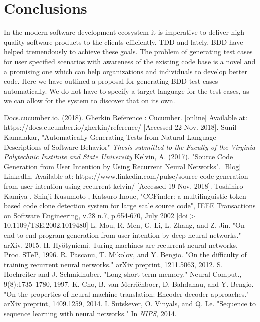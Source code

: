 \documentclass[conference, onecolumn, a4, 12pt]{IEEEtran}
\begin{document}
\section{Conclusions}
In the modern software development ecosystem it is imperative to deliver high quality software products to the clients efficiently. TDD and lately, BDD have helped tremendously to achieve these goals. The problem of generating test cases for user specified scenarios with awareness of the existing code base is a novel and a promising one which can help organizations and individuals to develop better code. Here we have outlined a proposal for generating BDD test cases automatically. We do not have to specify a target language for the test cases, as we can allow for the system to discover that on its own.

\begin{thebibliography}{00}
 Docs.cucumber.io. (2018). Gherkin Reference : Cucumber. [online] Available at: https://docs.cucumber.io/gherkin/reference/ [Accessed 22 Nov. 2018].
 Sunil Kamalakar, "Automatically Generating Tests from Natural Language Descriptions of Software Behavior" \textit{Thesis submitted to the Faculty of the
	Virginia Polytechnic Institute and State University
}
Kelvin, A. (2017). "Source Code Generation from User Intention by Using Recurrent Neural Networks". [Blog] LinkedIn. Available at: https://www.linkedin.com/pulse/source-code-generation-from-user-intention-using-recurrent-kelvin/ [Accessed 19 Nov. 2018].
 Toshihiro Kamiya , Shinji Kusumoto , Katsuro Inoue, "CCFinder: a multilinguistic token-based code clone detection system for large scale source code", IEEE Transactions on Software Engineering, v.28 n.7, p.654-670, July 2002  [doi$>$10.1109/TSE.2002.1019480]
 L. Mou, R. Men, G. Li, L. Zhang, and Z. Jin. "On end-to-end program generation from user intention by deep neural networks." arXiv, 2015.
 H. Hy\"{o}tyniemi. Turing machines are recurrent neural
networks. Proc. STeP, 1996.
 R. Pascanu, T. Mikolov, and Y. Bengio. "On the difficulty of training recurrent neural networks." arXiv preprint, 1211.5063, 2012.
 S. Hochreiter and J. Schmidhuber. "Long short-term memory." Neural Comput., 9(8):1735–1780, 1997.
 K. Cho, B. van Merri\"{e}nboer, D. Bahdanau, and Y. Bengio. "On the properties of neural machine translation: Encoder-decoder approaches." arXiv
preprint, 1409.1259, 2014.
 I. Sutskever, O. Vinyals, and Q. Le. "Sequence to
sequence learning with neural networks." In \textit{NIPS}, 2014.

\end{thebibliography}
\end{document}
